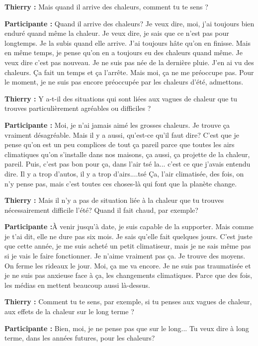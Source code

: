 \textbf{Thierry :} Mais quand il arrive des chaleurs, comment tu te sens ?

\textbf{Participante :} Quand il arrive des chaleurs? Je veux dire, moi, j'ai toujours bien enduré quand même la chaleur. Je veux dire, je sais que ce n'est pas pour longtemps. Je la subis quand elle arrive. J'ai toujours hâte qu'on en finisse. Mais en même temps, je pense qu'on en a toujours eu des chaleurs quand même. Je veux dire c'est pas nouveau. Je ne suis pas née de la dernière pluie. J'en ai vu des chaleurs. Ça fait un temps et ça l'arrête. Mais moi, ça ne me préoccupe pas. Pour le moment, je ne suis pas encore préoccupée par les chaleurs d'été, admettons.

\textbf{Thierry :} Y a-t-il des situations qui sont liées aux vagues de chaleur que tu trouves particulièrement agréables ou difficiles ?

\textbf{Participante :} Moi, je n'ai jamais aimé les grosses chaleurs. Je trouve ça vraiment désagréable. Mais il y a aussi, qu'est-ce qu'il faut dire? C'est que je pense qu'on est un peu complices de tout ça pareil parce que toutes les airs climatiques qu'on s'installe dans nos maisons, ça aussi, ça projette de la chaleur, pareil. Puis, c'est pas bon pour ça, dans l'air tsé la... c'est ce que j'avais entendu dire. Il y a trop d'autos, il y a trop d'airs....tsé Ça, l'air climatisée, des fois, on n'y pense pas, mais c'est toutes ces choses-là qui font que la planète change.

\textbf{Thierry :} Mais il n'y a pas de situation liée à la chaleur que tu trouves nécessairement difficile l'été? Quand il fait chaud, par exemple? 

\textbf{Participante :}À venir jusqu'à date, je suis capable de la supporter. Mais comme je t'ai dit, elle ne dure pas six mois. Je sais qu'elle fait quelques jours. C'est juste que cette année, je me suis acheté un petit climatiseur, mais je ne sais même pas si je vais le faire fonctionner. Je n'aime vraiment pas ça. Je trouve des moyens. On ferme les rideaux le jour. Moi, ça me va encore. Je ne suis pas traumatisée et je ne suis pas anxieuse face à ça, les changements climatiques. Parce que des fois, les médias en mettent beaucoup aussi là-dessus.

\textbf{Thierry :} Comment tu te sens, par exemple, si tu penses aux vagues de chaleur, aux effets de la chaleur sur le long terme ?

\textbf{Participante :} Bien, moi, je ne pense pas que sur le long... Tu veux dire à long terme, dans les années futures, pour les chaleurs? 

